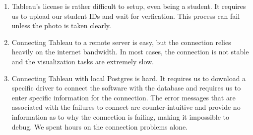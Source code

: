 \documentclass[10pt]{article}
\begin{document}
\begin{enumerate}

\item Tableau's license is rather difficult to setup, even being a student. It requires us to upload our student IDs and wait for verfication. This process can fail unless the photo is taken clearly.

\item Connecting Tableau to a remote server is easy, but the connection relies heavily on the internet bandwidth. In most cases, the connection is not stable and the visualization tasks are extremely slow.

\item Connecting Tableau with local Postgres is hard. It requires us to download a specific driver to connect the software with the database and requires us to enter specific information for the connection. The error messages that are associated with the failures to connect are counter-intuitive and provide no information as to why the connection is failing, making it impossible to debug. We spent hours on the connection problems alone.

\end{enumerate}
\end{document}
